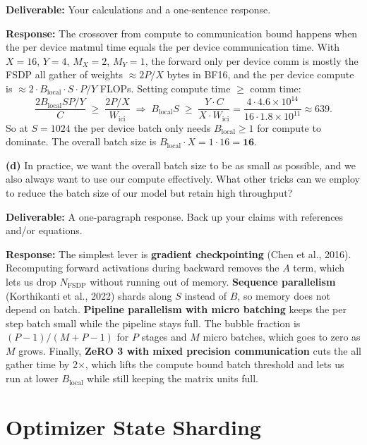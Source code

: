 \documentclass[11pt]{article}
\begin{document}
\textbf{Deliverable:} Your calculations and a one-sentence response.

\textbf{Response:}
The crossover from compute to communication bound happens when the per device matmul time equals the per device communication time. With $X = 16$, $Y = 4$, $M_X = 2$, $M_Y = 1$, the forward only per device comm is mostly the FSDP all gather of weights $\approx 2 P / X$ bytes in BF16, and the per device compute is $\approx 2 \cdot B_\text{local} \cdot S \cdot P / Y$ FLOPs. Setting compute time $\ge$ comm time:
\[
\frac{2 B_\text{local} S P / Y}{C} \;\ge\; \frac{2 P / X}{W_\text{ici}} \;\Longrightarrow\; B_\text{local} S \;\ge\; \frac{Y \cdot C}{X \cdot W_\text{ici}} = \frac{4 \cdot 4.6\times 10^{14}}{16 \cdot 1.8\times 10^{11}} \approx 639.
\]
So at $S = 1024$ the per device batch only needs $B_\text{local} \ge 1$ for compute to dominate. The overall batch size is $B_\text{local} \cdot X = 1 \cdot 16 = \mathbf{16}$.

\textbf{(d)} In practice, we want the overall batch size to be as small as possible, and we also always want to use our compute effectively. What other tricks can we employ to reduce the batch size of our model but retain high throughput?

\textbf{Deliverable:} A one-paragraph response. Back up your claims with references and/or equations.

\textbf{Response:}
The simplest lever is \textbf{gradient checkpointing} (Chen et al., 2016). Recomputing forward activations during backward removes the $A$ term, which lets us drop $N_\text{FSDP}$ without running out of memory. \textbf{Sequence parallelism} (Korthikanti et al., 2022) shards along $S$ instead of $B$, so memory does not depend on batch. \textbf{Pipeline parallelism with micro batching} keeps the per step batch small while the pipeline stays full. The bubble fraction is $(P-1)/(M+P-1)$ for $P$ stages and $M$ micro batches, which goes to zero as $M$ grows. Finally, \textbf{ZeRO 3 with mixed precision communication} cuts the all gather time by 2$\times$, which lifts the compute bound batch threshold and lets us run at lower $B_\text{local}$ while still keeping the matrix units full.

\section{Optimizer State Sharding}
\end{document}
